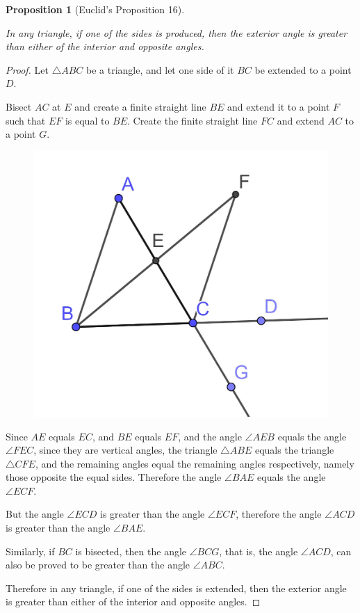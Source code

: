 \documentclass[
]{book}
\newtheorem{proposition}{Proposition}[chapter]
\theoremstyle{definition}
\theoremstyle{definition}
\theoremstyle{definition}
\theoremstyle{definition}
\theoremstyle{remark}
\begin{document}
\begin{proposition}[Euclid's Proposition 16]
\protect\hypertarget{prp:prop16}{}\label{prp:prop16}

In any triangle, if one of the sides is produced, then the exterior angle is greater than either of the interior and opposite angles.

\end{proposition}

\begin{proof}

Let \(\triangle ABC\) be a triangle, and let one side of it \(BC\) be extended to a point \(D\).

Bisect \(AC\) at \(E\) and create a finite straight line \(BE\) and extend it to a point \(F\) such that \(EF\) is equal to \(BE\). Create the finite straight line \(FC\) and extend \(AC\) to a point \(G\).

\begin{figure}

{\centering \includegraphics[width=0.3\linewidth]{images/Prop16} 

}

\end{figure}

Since \(AE\) equals \(EC\), and \(BE\) equals \(EF\), and the angle \(\angle AEB\) equals the angle \(\angle FEC\), since they are vertical angles, the triangle \(\triangle ABE\) equals the triangle \(\triangle CFE\), and the remaining angles equal the remaining angles respectively, namely those opposite the equal sides. Therefore the angle \(\angle BAE\) equals the angle \(\angle ECF\).

But the angle \(\angle ECD\) is greater than the angle \(\angle ECF\), therefore the angle \(\angle ACD\) is greater than the angle \(\angle BAE\).

Similarly, if \(BC\) is bisected, then the angle \(\angle BCG\), that is, the angle \(\angle ACD\), can also be proved to be greater than the angle \(\angle ABC\).

Therefore in any triangle, if one of the sides is extended, then the exterior angle is greater than either of the interior and opposite angles.

\end{proof}
\end{document}

